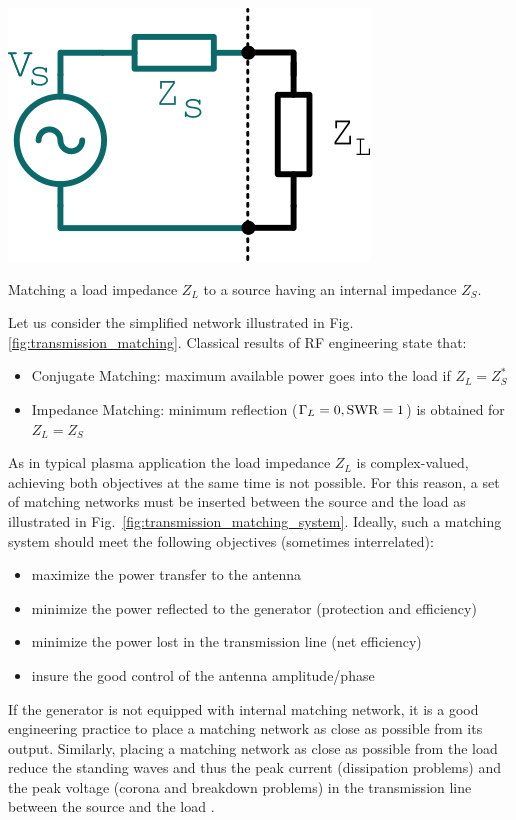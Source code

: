 \begin{marginfigure}[*+5]
	\includegraphics[width=0.8\linewidth]{figures/chap3/transmission_line_matching}
	\caption{Matching a load impedance $Z_L$ to a source having an internal impedance $Z_S$.}
	\label{fig:transmission_matching}
\end{marginfigure}

Let us consider the simplified network illustrated in Fig.\ref{fig:transmission_matching}. Classical results of RF engineering state that\cite{Rizzi1988, pozar2012}:
\begin{itemize}
	\item Conjugate Matching: maximum available power goes into the load if $Z_L=Z_S^*$
	\item Impedance Matching: minimum reflection ($\Gamma_L=0, {\mathrm{SWR}}=1$) is obtained for $Z_L=Z_S$
\end{itemize} 
As in typical plasma application the load impedance $Z_L$ is complex-valued, achieving both objectives at the same time is not possible. For this reason, a set of matching networks must be inserted between the source and the load as illustrated in Fig.~\ref{fig:transmission_matching_system}. Ideally, such a matching system should meet the following objectives (sometimes interrelated):
\begin{itemize}
	\item maximize the power transfer to the antenna 
	\item minimize the power reflected to the generator (protection and efficiency)
	\item minimize the power lost in the transmission line (net efficiency)
	\item insure the good control of the antenna amplitude/phase
\end{itemize}

If the generator is not equipped with internal matching network, it is a good engineering practice to place a matching network as close as possible from its output. Similarly, placing a matching network as close as possible from the load reduce the standing waves and thus the peak current (dissipation problems) and the peak voltage (corona and breakdown problems) in the transmission line between the source and the load \cite[§4]{Rizzi1988}.

